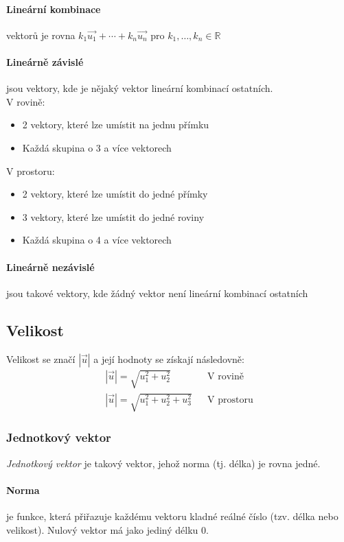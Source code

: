 \documentclass[12pt]{article}
\begin{document}
\paragraph{Lineární kombinace} vektorů je rovna $k_1 \vec{u_1} + \dotsb + k_n \vec{u_n}$ pro $k_1, \dotsc, k_n \in \mathbb{R}$
\paragraph{Lineárně závislé} jsou vektory, kde je nějaký vektor lineární kombinací ostatních.\\
V rovině:
\begin{itemize}
\item 2 vektory, které lze umístit na jednu přímku
\item Každá skupina o 3 a více vektorech
\end{itemize}
V prostoru:
\begin{itemize}
\item 2 vektory, které lze umístit do jedné přímky
\item 3 vektory, které lze umístit do jedné roviny
\item Každá skupina o 4 a více vektorech
\end{itemize}
\paragraph{Lineárně nezávislé} jsou takové vektory, kde žádný vektor není lineární kombinací ostatních
\subsection{Velikost}
Velikost se značí $|\vec{u}|$ a její hodnoty se získají následovně:
\begin{align}
|\vec{u}| = \sqrt{u_1^2 + u_2^2 } && \text{V rovině}\\
|\vec{u}| = \sqrt{u_1^2 + u_2^2 + u_3^2 }&& \text{V prostoru}
\end{align}
\subsubsection{Jednotkový vektor}
\emph{Jednotkový vektor} je takový vektor, jehož norma (tj. délka) je rovna jedné.
\paragraph{Norma} je funkce, která přiřazuje každému vektoru kladné reálné číslo (tzv. délka nebo velikost). Nulový vektor má jako jediný délku 0.
\end{document}
